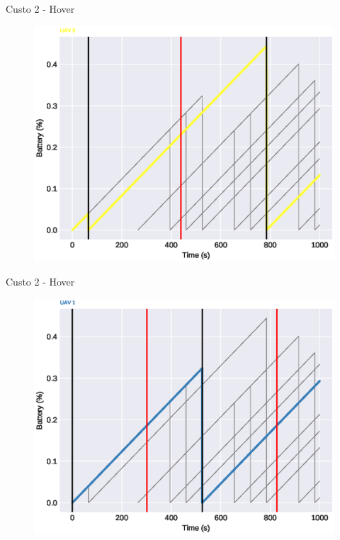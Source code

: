 \begin{frame}{Custo 2 - Hover}
                \begin{figure}[!htb]
                     \includegraphics[width=\textwidth]{custo_2/uav_hover_acum_uav_5.eps}
                 \end{figure}
            \end{frame}\begin{frame}{Custo 2 - Hover}
                \begin{figure}[!htb]
                     \includegraphics[width=\textwidth]{custo_2/uav_hover_acum_uav_1.eps}
                 \end{figure}

\end{frame}
